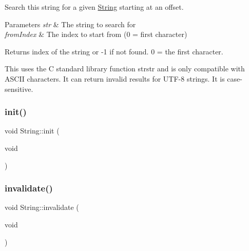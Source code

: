 Search this string for a given \hyperlink{class_string}{String} starting at an offset. 


\begin{DoxyParams}{Parameters}
{\em str} & The string to search for\\
\hline
{\em from\+Index} & The index to start from (0 = first character)\\
\hline
\end{DoxyParams}
\begin{DoxyReturn}{Returns}
index of the string or -\/1 if not found. 0 = the first character.
\end{DoxyReturn}
This uses the C standard library function strstr and is only compatible with A\+S\+C\+II characters. It can return invalid results for U\+T\+F-\/8 strings. It is case-\/sensitive. \mbox{\label{class_string_af597f6dc5a6a96d14d5409b48254b8fb}} 
\subsubsection{\texorpdfstring{init()}{init()}}
{\footnotesize\ttfamily void String\+::init (\begin{DoxyParamCaption}\item[{void}]{ }\end{DoxyParamCaption})\hspace{0.3cm}{\ttfamily [protected]}}

\mbox{\label{class_string_a9bee9137075d66b2af742969cb7549d9}} 
\subsubsection{\texorpdfstring{invalidate()}{invalidate()}}
{\footnotesize\ttfamily void String\+::invalidate (\begin{DoxyParamCaption}\item[{void}]{ }\end{DoxyParamCaption})\hspace{0.3cm}{\ttfamily [protected]}}

\mbox{\label{class_string_a63a465c7d1e67129b04cf4693b756e5b}} 
